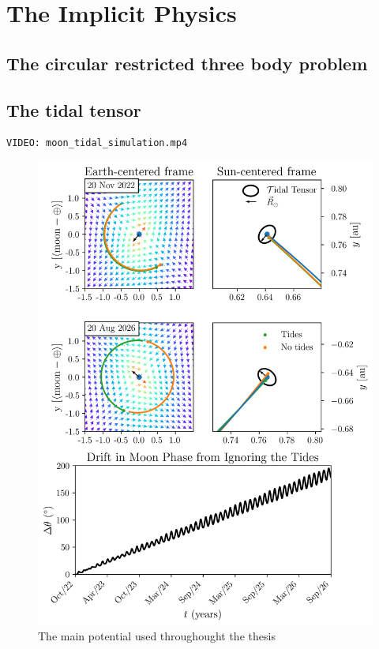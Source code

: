 \section{The Implicit Physics}

    \subsection{The circular restricted three body problem}

    \subsection{The tidal tensor}
        
\begin{verbatim}
VIDEO: moon_tidal_simulation.mp4
\end{verbatim}

        \begin{figure}
            \centering
            \includegraphics[width=\linewidth]{images/moon_tidal_simulation.png}
            \caption{The main potential used throughought the thesis}
        \end{figure}

